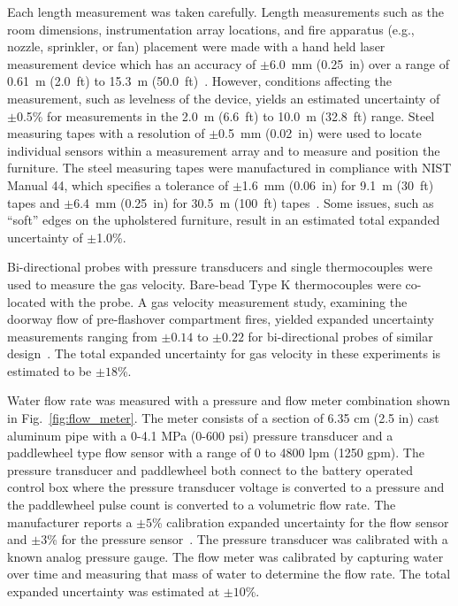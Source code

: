 \documentclass[12pt,oneside]{book}
\begin{document}
Each length measurement was taken carefully. Length measurements such as the room dimensions, instrumentation array locations, and fire apparatus (e.g., nozzle, sprinkler, or fan) placement were made with a hand held laser measurement device which has an accuracy of $\pm$6.0~mm (0.25~in) over a range of 0.61~m (2.0~ft) to 15.3~m (50.0~ft)~\cite{StanleyTools}.  However, conditions affecting the measurement, such as levelness of the device, yields an estimated uncertainty of $\pm$0.5\% for measurements in the 2.0~m (6.6~ft) to 10.0~m (32.8~ft) range. Steel measuring tapes with a resolution of $\pm$0.5~mm (0.02~in) were used to locate individual sensors within a measurement array and to measure and position the furniture. The steel measuring tapes were manufactured in compliance with NIST Manual 44, which specifies a tolerance of $\pm$1.6~mm (0.06~in) for 9.1~m (30~ft) tapes and $\pm$6.4~mm (0.25~in) for 30.5~m (100~ft) tapes~\cite{Butcher:2012}. Some issues, such as ``soft'' edges on the upholstered furniture, result in an estimated total expanded uncertainty of $\pm$1.0\%.

Bi-directional probes with pressure transducers and single thermocouples were used to measure the gas velocity. Bare-bead Type K thermocouples were co-located with the probe. A gas velocity measurement study, examining the doorway flow of pre-flashover compartment fires, yielded expanded uncertainty measurements ranging from $\pm0.14$ to $\pm0.22$ for bi-directional probes of similar design~\cite{Bryant:FSJ2009}. The total expanded uncertainty for gas velocity in these experiments is estimated to be $\pm18$\%.   

Water flow rate was measured with a pressure and flow meter combination shown in Fig.~\ref{fig:flow_meter}. The meter consists of a section of 6.35 cm (2.5 in) cast aluminum pipe with a 0-4.1 MPa (0-600 psi) pressure transducer and a paddlewheel type flow sensor with a range of 0 to 4800 lpm (1250 gpm). The pressure transducer and paddlewheel both connect to the battery operated control box where the pressure transducer voltage is converted to a pressure and the paddlewheel pulse count is converted to a volumetric flow rate. The manufacturer reports a $\pm5$\% calibration expanded uncertainty for the flow sensor and $\pm3$\%  for the pressure sensor~\cite{Akron}. The pressure transducer was calibrated with a known analog pressure gauge. The flow meter was calibrated by capturing water over time and measuring that mass of water to determine the flow rate. The total expanded uncertainty was estimated at $\pm10$\%. 
\end{document}
